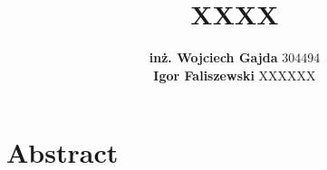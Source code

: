 \documentclass[15pt]{sprawozdanie}
\title{XXXX}
\author{\textbf{inż. Wojciech Gajda} 304494\\\vspace{20pt}\textbf{Igor Faliszewski} XXXXXX}
\begin{document}
\maketitle

\tableofcontents
\newpage

\section{Abstract}
\end{document}
